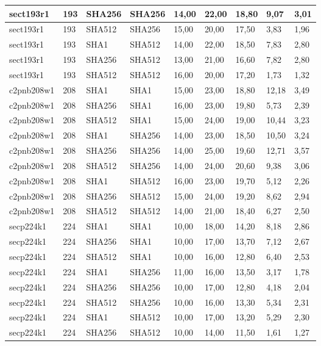 \begin{longtable}{| l | l | l | l | l |l |l |l |l |}
sect193r1 & 193 & SHA256 & SHA256 & 14,00 & 22,00 & 18,80 & 9,07 & 3,01 \\ \hline 
sect193r1 & 193 & SHA512 & SHA256 & 15,00 & 20,00 & 17,50 & 3,83 & 1,96 \\ \hline 
sect193r1 & 193 & SHA1 & SHA512 & 14,00 & 22,00 & 18,50 & 7,83 & 2,80 \\ \hline 
sect193r1 & 193 & SHA256 & SHA512 & 13,00 & 21,00 & 16,60 & 7,82 & 2,80 \\ \hline 
sect193r1 & 193 & SHA512 & SHA512 & 16,00 & 20,00 & 17,20 & 1,73 & 1,32 \\ \hline 
c2pnb208w1 & 208 & SHA1 & SHA1 & 15,00 & 23,00 & 18,80 & 12,18 & 3,49 \\ \hline 
c2pnb208w1 & 208 & SHA256 & SHA1 & 16,00 & 23,00 & 19,80 & 5,73 & 2,39 \\ \hline 
c2pnb208w1 & 208 & SHA512 & SHA1 & 15,00 & 24,00 & 19,00 & 10,44 & 3,23 \\ \hline 
c2pnb208w1 & 208 & SHA1 & SHA256 & 14,00 & 23,00 & 18,50 & 10,50 & 3,24 \\ \hline 
c2pnb208w1 & 208 & SHA256 & SHA256 & 14,00 & 25,00 & 19,60 & 12,71 & 3,57 \\ \hline 
c2pnb208w1 & 208 & SHA512 & SHA256 & 14,00 & 24,00 & 20,60 & 9,38 & 3,06 \\ \hline 
c2pnb208w1 & 208 & SHA1 & SHA512 & 16,00 & 23,00 & 19,70 & 5,12 & 2,26 \\ \hline 
c2pnb208w1 & 208 & SHA256 & SHA512 & 15,00 & 24,00 & 19,20 & 8,62 & 2,94 \\ \hline 
c2pnb208w1 & 208 & SHA512 & SHA512 & 14,00 & 21,00 & 18,40 & 6,27 & 2,50 \\ \hline 
secp224k1 & 224 & SHA1 & SHA1 & 10,00 & 18,00 & 14,20 & 8,18 & 2,86 \\ \hline 
secp224k1 & 224 & SHA256 & SHA1 & 10,00 & 17,00 & 13,70 & 7,12 & 2,67 \\ \hline 
secp224k1 & 224 & SHA512 & SHA1 & 10,00 & 16,00 & 12,80 & 6,40 & 2,53 \\ \hline 
secp224k1 & 224 & SHA1 & SHA256 & 11,00 & 16,00 & 13,50 & 3,17 & 1,78 \\ \hline 
secp224k1 & 224 & SHA256 & SHA256 & 10,00 & 17,00 & 12,80 & 4,18 & 2,04 \\ \hline 
secp224k1 & 224 & SHA512 & SHA256 & 10,00 & 16,00 & 13,30 & 5,34 & 2,31 \\ \hline 
secp224k1 & 224 & SHA1 & SHA512 & 10,00 & 17,00 & 13,20 & 5,29 & 2,30 \\ \hline 
secp224k1 & 224 & SHA256 & SHA512 & 10,00 & 14,00 & 11,50 & 1,61 & 1,27 \\ \hline 

\end{longtable}
